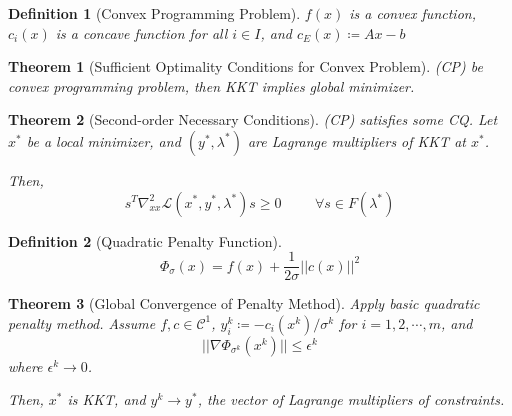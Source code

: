\documentclass[a4paper]{article}
\newcommand{\C}{\mathcal{C}}
\newcommand{\norm}[1]{\lvert \lvert #1 \rvert \rvert}
\newtheorem{theorem}{Theorem}
\newtheorem*{definition*}{Definition}
\begin{document}
\begin{definition*}[Convex Programming Problem]
    $f(x)$ is a convex function, $c_i(x)$ is a concave function for all $i \in I$,
    and $c_E(x) \coloneqq Ax - b$
\end{definition*}

\setcounter{theorem}{17}
\begin{theorem}[Sufficient Optimality Conditions for Convex Problem]
    (CP) be convex programming problem, then KKT implies global minimizer.
\end{theorem}

\begin{theorem}[Second-order Necessary Conditions]
    (CP) satisfies some CQ. Let $x^*$ be a local minimizer,
    and $\left( y^*, \lambda^* \right)$ are Lagrange multipliers of KKT at $x^*$.

    Then,
    \begin{equation*}
        s^T \nabla_{xx}^2 \mathcal{L} \left( x^*, y^*, \lambda^* \right) s \geq 0 \hspace{1cm} \forall s \in F \left( \lambda^* \right)
    \end{equation*}
\end{theorem}


\begin{definition*}[Quadratic Penalty Function]
    \begin{equation*}
        \Phi_\sigma (x) = f(x) + \frac{1}{2\sigma} \norm{c(x)}^2
    \end{equation*}
\end{definition*}

\setcounter{theorem}{20}
\begin{theorem}[Global Convergence of Penalty Method]
    Apply basic quadratic penalty method.
    Assume $f,c \in \C^1$, $y_i^k \coloneqq -c_i \left( x^k \right) / \sigma^k$ for $i = 1, 2, \cdots, m$, and
    \begin{equation*}
        \norm{\nabla \Phi_{\sigma^k} \left( x^k \right)} \leq \epsilon^k
    \end{equation*}
    where $\epsilon^k \rightarrow 0$.

    Then,
    $x^*$ is KKT, and $y^k \rightarrow y^*$, the vector of Lagrange multipliers of constraints.
\end{theorem}
\end{document}
